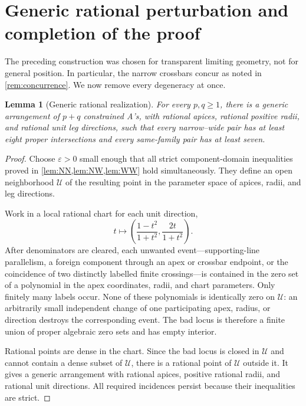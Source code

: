 \documentclass[11pt]{amsart}
\newtheorem{lemma}[lemma]{Lemma}
\theoremstyle{definition}
\newcommand{\eps}{\varepsilon}
\begin{document}
\section{Generic rational perturbation and completion of the proof}
\label{sec:perturbation}

The preceding construction was chosen for transparent limiting geometry,
not for general position.  In particular, the narrow crossbars concur as
noted in \cref{rem:concurrence}.  We now remove every degeneracy at once.

\begin{lemma}[Generic rational realization]\label{lem:generic}
For every $p,q\ge1$, there is a generic arrangement of $p+q$ constrained
A's, with rational apices, rational positive radii, and rational unit leg
directions, such that every narrow--wide pair has at least eight proper
intersections and every same-family pair has at least seven.
\end{lemma}

\begin{proof}
Choose $\eps>0$ small enough that all strict component-domain inequalities
proved in \cref{lem:NN,lem:NW,lem:WW} hold simultaneously.  They define an
open neighborhood $\mathcal U$ of the resulting point in the parameter
space of apices, radii, and leg directions.

Work in a local rational chart for each unit direction,
\[
 t\longmapsto
 \left(\frac{1-t^2}{1+t^2},\frac{2t}{1+t^2}\right).
\]
After denominators are cleared, each unwanted event---supporting-line
parallelism, a foreign component through an apex or crossbar endpoint, or
the coincidence of two distinctly labelled finite crossings---is contained
in the zero set of a polynomial in the apex coordinates, radii, and chart
parameters.  Only finitely many labels occur.  None of these polynomials is
identically zero on $\mathcal U$: an arbitrarily small independent change of
one participating apex, radius, or direction destroys the corresponding
event.  The bad locus is therefore a finite union of proper algebraic zero
sets and has empty interior.

Rational points are dense in the chart.  Since the bad locus is closed in
$\mathcal U$ and cannot contain a dense subset of $\mathcal U$, there is a
rational point of $\mathcal U$ outside it.  It gives a generic arrangement
with rational apices, positive rational radii, and rational unit directions.
All required incidences persist because their inequalities are strict.
\end{proof}
\end{document}
